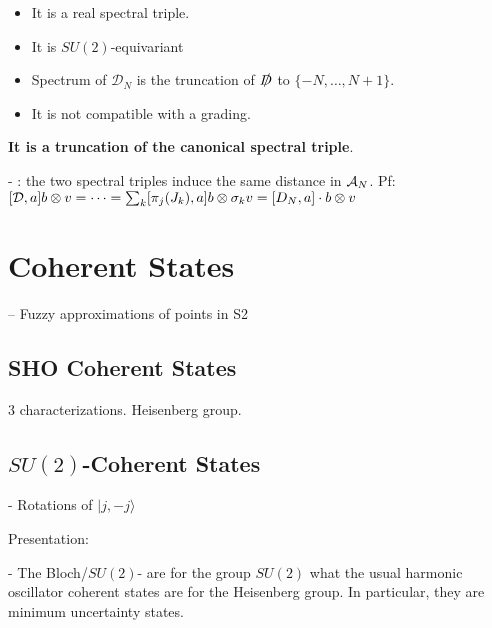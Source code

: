     \begin{itemize}
    
    \item It is a real spectral triple.
    
    \item It is $SU(2)$-equivariant
    
    \item Spectrum of $\mathcal D_N$ is the truncation of $\slashed D$ to $\{-N, \dots, N+1\}$.%
    
    \item It is not compatible with a grading.
    
    \end{itemize}

\textbf{It is a truncation of the canonical spectral triple}.

- : the two spectral triples induce the same distance in $\mathcal A_N$. Pf: $[\mathcal D, a]b \otimes v = \cdots = \sum_k [\pi_j(J_k), a]b \otimes \sigma_k v = [D_N, a] \cdot b \otimes v$

\linea

\section{Coherent States}

-- Fuzzy approximations of points in S2

\subsection{SHO Coherent States}

3 characterizations. Heisenberg group.
\subsection{$SU(2)$-Coherent States}

 - Rotations of $|j, -j \rangle$
 
Presentation:

- The Bloch/$SU(2)$- are for the group $SU(2)$ what the usual harmonic oscillator coherent states are for the Heisenberg group. In particular, they are minimum uncertainty states. 

